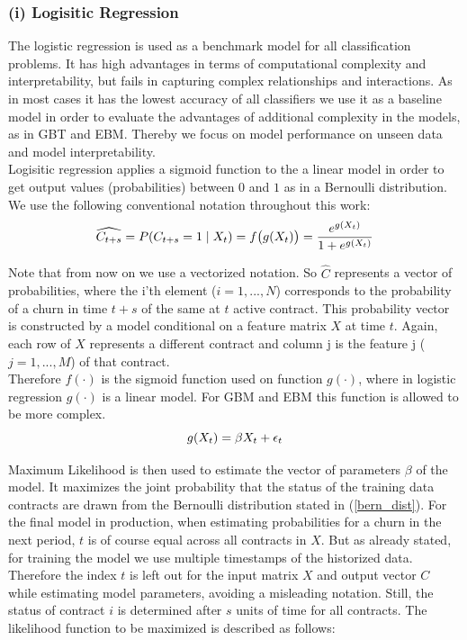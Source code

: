 \documentclass[12pt,titlepage]{article}
\begin{document}
\subsubsection*{(i) Logisitic Regression}
The logistic regression is used as a benchmark model for all classification problems. It has high advantages in terms of computational complexity and interpretability, but fails in capturing complex relationships and interactions. As in most cases it has the lowest accuracy of all classifiers we use it as a baseline model in order to evaluate the advantages of additional complexity in the models, as in GBT and EBM. Thereby we focus on model performance on unseen data and model interpretability.\\
Logisitic regression applies a sigmoid function to the a linear model in order to get output values (probabilities) between $0$ and $1$ as in a Bernoulli distribution. We use the following conventional notation throughout this work: \\

\begin{equation} \label{bern_dist}
    \widehat{C_{t+s}} = P(C_{t+s}=1\mid X_{t}) = f\big(g(X_{t})\big) = \frac{e^{g(X_{t})}}{1 + e^{g(X_{t})}} \\
\end{equation}

Note that from now on we use a vectorized notation. So $\hat{C}$ represents a vector of probabilities, where the i'th element ($i = 1,...,N$) corresponds to the probability of a churn in time $t+s$ of the same at $t$ active contract. This probability vector is constructed by a model conditional on a feature matrix $X$ at time $t$. Again, each row of $X$ represents a different contract and column j is the feature j ($j = 1,...,M$) of that contract. \\
Therefore $f(\cdot)$ is the sigmoid function used on function $g(\cdot)$, where in logistic regression $g(\cdot)$ is a linear model. For GBM and EBM this function is allowed to be more complex. \\

\begin{equation} \label{lin_model}
    g(X_{t}) = \beta X_{t} + \epsilon_{t} \\
\end{equation}

Maximum Likelihood is then used to estimate the vector of parameters $\beta$ of the model. It maximizes the joint probability that the status of the training data contracts are drawn from the Bernoulli distribution stated in (\ref{bern_dist}). For the final model in production, when estimating probabilities for a churn in the next period, $t$ is of course equal across all contracts in $X$. But as already stated, for training the model we use multiple timestamps of the historized data. Therefore the index $t$ is left out for the input matrix $X$ and output vector $C$ while estimating model parameters, avoiding a misleading notation. Still, the status of contract $i$ is determined after $s$ units of time for all contracts. The likelihood function to be maximized is described as follows: \\
\end{document}
